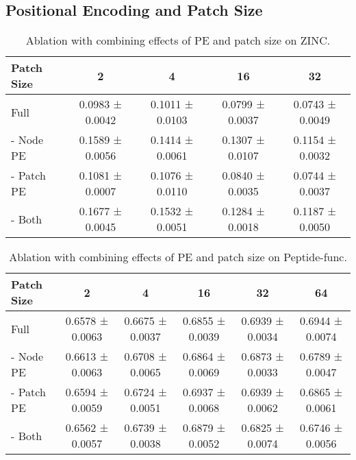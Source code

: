 \documentclass{article}
\begin{document}
\subsection{Positional Encoding and Patch Size}
\begin{table}[!ht]
    \centering
    \small
\caption{Ablation with combining effects of PE and patch size on ZINC.}
\label{tab: pe and patch size (zinc)}
    \begin{tabular}{lcccc}    
    \toprule
Patch Size & 2 & 4 & 16 & 32 
\\
    \midrule
    Full   
    & 0.0983 ± 0.0042 
    & 0.1011 ± 0.0103
    & 0.0799 ± 0.0037
    & 0.0743 ± 0.0049 
\\
    
     - Node PE 
    & 0.1589 ± 0.0056
    & 0.1414 ± 0.0061
    & 0.1307 ± 0.0107
    & 0.1154 ± 0.0032 
\\
     
     - Patch PE
    & 0.1081 ± 0.0007
    & 0.1076 ± 0.0110
    & 0.0840 ± 0.0035
    & 0.0744 ± 0.0037 
\\
     
     - Both 
    & 0.1677 ± 0.0045
    & 0.1532 ± 0.0051
    & 0.1284 ± 0.0018
    & 0.1187 ± 0.0050 
\\
     \bottomrule
    \end{tabular}
\end{table}

\begin{table}[!ht]
    \centering
    \small
\caption{Ablation with combining effects of PE and patch size on Peptide-func.}
    \label{tab: pe and patch size (peptide)}
    \begin{tabular}{lccccc}
    \toprule
Patch Size & 2 & 4 & 16 & 32 & 64 
    \\
\midrule
    Full     
    & 0.6578 ± 0.0063 
    & 0.6675 ± 0.0037 
    & 0.6855 ± 0.0039
    & 0.6939 ± 0.0034 
    & 0.6944 ± 0.0074
\\
    
     - Node PE 
     & 0.6613 ± 0.0063
     & 0.6708 ± 0.0065
     & 0.6864 ± 0.0069
     & 0.6873 ± 0.0033 
     & 0.6789 ± 0.0047
\\
     
     - Patch PE
     & 0.6594 ± 0.0059
     & 0.6724 ± 0.0051
     & 0.6937 ± 0.0068
     & 0.6939 ± 0.0062
     & 0.6865 ± 0.0061
\\
     
     - Both 
     & 0.6562 ± 0.0057
     & 0.6739 ± 0.0038
     & 0.6879 ± 0.0052
     & 0.6825 ± 0.0074
     & 0.6746 ± 0.0056
\\
     \bottomrule
    \end{tabular}
\end{table}
\end{document}
